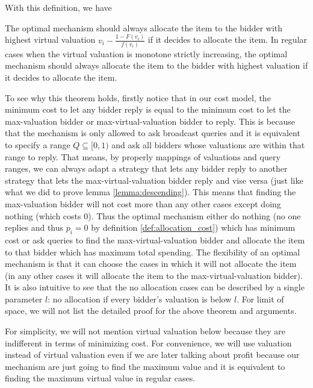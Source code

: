With this definition, we have

\begin{theorem}
The optimal mechanism should always allocate the item to the bidder with
highest virtual valuation $v_i - \frac{1-F(v_i)}{f(v_i)}$ if it decides to
allocate the item. In regular cases when the virtual valuation is monotone
strictly increasing, the optimal mechanism should always allocate the item to
the bidder with highest valuation if it decides to allocate the item.
\end{theorem}

To see why this theorem holds, firstly notice that in our cost model, the
minimum cost to let any bidder reply is equal to the minimum cost to let the
max-valuation bidder or max-virtual-valuation bidder to reply.
This is because that the mechanism is only allowed to ask broadcast
queries and it is equivalent to specify a range $Q \subseteq [0, 1)$ and ask all
bidders whose valuations are within that range to reply. That means, by
properly mappings of valuations and query ranges, we can always adapt a
strategy that lets any bidder reply to another strategy that lets the
max-virtual-valuation bidder reply and vise versa (just like what we did to prove lemma
\ref{lemma:descending}). This means that finding the max-valuation bidder will not
cost more than any other cases except doing nothing (which costs $0$). Thus the
optimal mechanism either do nothing (no one replies and thus $p_i = 0$ by
definition \ref{def:allocation_cost}) which has minimum cost or ask queries to
find the max-virtual-valuation bidder and allocate the item to that bidder which has
maximum total spending.  The flexibility of an optimal mechanism is that it can
choose the cases in which it will not allocate the item (in any other cases it
will allocate the item to the max-virtual-valuation bidder). It is also intuitive
to see that the no allocation cases can be described by a single parameter $l$:
no allocation if every bidder's valuation is below $l$. For limit of space,
we will not list the detailed proof for the above theorem and arguments.

For simplicity, we will not mention virtual valuation below because they are 
indifferent in terms of minimizing cost.  For convenience, we will use
valuation instead of virtual valuation even if we are later talking about
profit because our mechanism are just going to find the maximum value and it is
equivalent to finding the maximum virtual value in regular cases.

